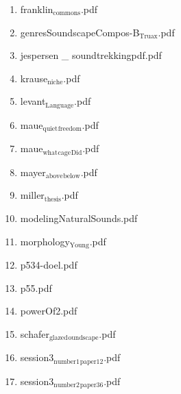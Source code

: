 \documentclass[11pt]{article}
\begin{document}
\begin{enumerate}
\begin{enumerate}
\begin{enumerate}
\item franklin$_{\text{commons}}$.pdf
\label{sec-1-1-1-1-11-19-20-20-2-37}

\item genresSoundscapeCompos-B$_{\text{Truax}}$.pdf
\label{sec-1-1-1-1-11-19-20-20-2-38}

\item jespersen \_ soundtrekkingpdf.pdf
\label{sec-1-1-1-1-11-19-20-20-2-39}

\item krause$_{\text{niche}}$.pdf
\label{sec-1-1-1-1-11-19-20-20-2-40}

\item levant$_{\text{Language}}$.pdf
\label{sec-1-1-1-1-11-19-20-20-2-41}

\item maue$_{\text{quiet}}$$_{\text{freedom}}$.pdf
\label{sec-1-1-1-1-11-19-20-20-2-42}

\item maue$_{\text{what}}$$_{\text{cage}}$$_{\text{Did}}$.pdf
\label{sec-1-1-1-1-11-19-20-20-2-43}

\item mayer$_{\text{above}}$$_{\text{below}}$.pdf
\label{sec-1-1-1-1-11-19-20-20-2-44}

\item miller$_{\text{thesis}}$.pdf
\label{sec-1-1-1-1-11-19-20-20-2-45}

\item modelingNaturalSounds.pdf
\label{sec-1-1-1-1-11-19-20-20-2-46}

\item morphology$_{\text{Young}}$.pdf
\label{sec-1-1-1-1-11-19-20-20-2-47}

\item p534-doel.pdf
\label{sec-1-1-1-1-11-19-20-20-2-48}

\item p55.pdf
\label{sec-1-1-1-1-11-19-20-20-2-49}

\item powerOf2.pdf
\label{sec-1-1-1-1-11-19-20-20-2-50}

\item schafer$_{\text{glazed}}$$_{\text{oundscape}}$.pdf
\label{sec-1-1-1-1-11-19-20-20-2-51}

\item session3$_{\text{number1}}$$_{\text{paper12}}$.pdf
\label{sec-1-1-1-1-11-19-20-20-2-52}

\item session3$_{\text{number2}}$$_{\text{paper36}}$.pdf
\label{sec-1-1-1-1-11-19-20-20-2-53}


\end{enumerate}
\end{enumerate}
\end{enumerate}
\end{document}
